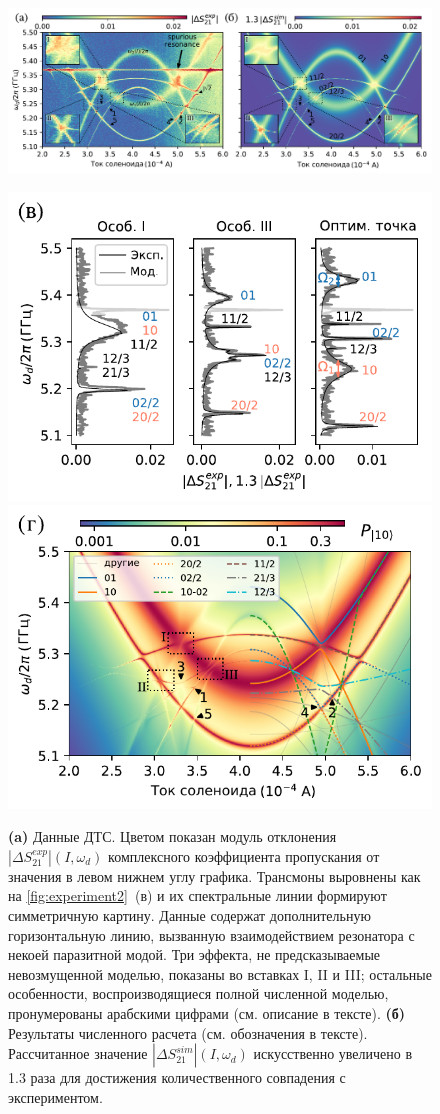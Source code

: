 \documentclass[14pt, a4paper]{extreport}
\numberwithin{equation}{section}
\begin{document}
\begin{figure}
	
	\centering
	\includegraphics[width=\linewidth]{main_picture}
	
	\includegraphics[width=.495\linewidth]{main_picture_slices}
	\includegraphics[width=.495\linewidth]{stationary}
	\caption{\textbf{(a)} 
		Данные ДТС. Цветом показан модуль отклонения $|\Delta S^{exp}_{21}| (I, \omega_d)$ комплексного коэффициента пропускания от значения в левом нижнем углу графика. 
		Трансмоны выровнены как на 
		\autoref{fig:experiment2}~(в) и их спектральные линии формируют симметричную картину. Данные содержат дополнительную горизонтальную линию, вызванную взаимодействием резонатора с некоей паразитной модой. Три эффекта, не предсказываемые невозмущенной моделью, показаны во вставках I, II и III; остальные особенности, воспроизводящиеся полной численной моделью, пронумерованы арабскими цифрами (см. описание в тексте). \textbf{(б)} Результаты численного расчета (см. обозначения в тексте). Рассчитанное значение $|\Delta S^{sim}_{21}| (I, \omega_d)$ искусственно увеличено в 1.3 раза для достижения количественного совпадения с экспериментом.
}
\end{figure}
\end{document}

